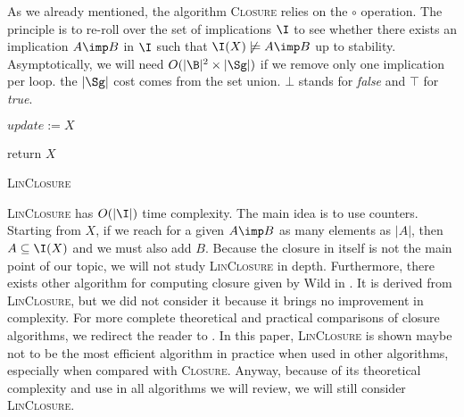 \documentclass[a4paper, 10pt]{article}
\begin{document}
As we already mentioned, the algorithm \textsc{Closure} relies on the $\circ$ 
operation. The principle is to re-roll over the set of implications $\I$ to see 
whether there exists an implication $A \imp B$ in $\I$ such that $\I(X) 
\not\models A \imp B$ up to stability. Asymptotically, we will need $O(|\B|^2 
\times |\Sg|)$ if we remove only one implication per loop. the $|\Sg|$ cost
comes from the set union. $\bot$ stands for \textit{false} and $\top$ for \textit{true}.

\begin{algorithm}
	
	\BlankLine
	\BlankLine
	
	
	\BlankLine
	
	$update := X$ \;
	
	\BlankLine
	
	
	return $X$ \;
	
	\caption{\textsc{LinClosure}}
	\label{alg:linclosure}
\end{algorithm}

\textsc{LinClosure} has $O(|\I|)$ time complexity. The main idea is to use
counters. Starting from $X$, if we reach for a given $A \imp B$ as many elements
as $|A|$, then $A \subseteq \I(X)$ and we must also add $B$. Because the closure
in itself is not the main point of our topic, we will not study 
\textsc{LinClosure} in depth. Furthermore, there exists other
algorithm for computing closure given by Wild in \cite{wild_computations_1995}. It is derived from \textsc{LinClosure}, but we did not consider it because it brings no improvement in complexity. For more complete theoretical and practical comparisons of closure algorithms, we redirect the reader to 
\cite{bazhanov_optimizations_2014}. In this paper, \textsc{LinClosure} is 
shown maybe not to be the most efficient algorithm in practice when used in 
other algorithms, especially when compared with \textsc{Closure}. Anyway, 
because of its theoretical complexity and use in all algorithms we will review, 
we will still consider \textsc{LinClosure}.
\end{document}
